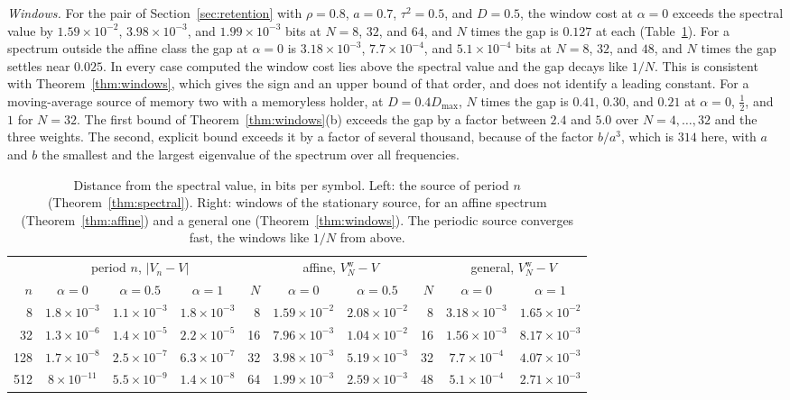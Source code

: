 \documentclass[11pt,onecolumn]{IEEEtran}
\begin{document}
\emph{Windows.} For the pair of Section~\ref{sec:retention} with
$\rho=0.8$, $a=0.7$, $\tau^2=0.5$, and $D=0.5$, the window cost at
$\alpha=0$ exceeds the spectral value by $1.59\times10^{-2}$, $3.98\times10^{-3}$, and $1.99\times10^{-3}$ bits at $N=8$,
$32$, and $64$, and $N$ times the gap is $0.127$ at each
(Table~\ref{tab:conv}). For a spectrum outside the affine class the gap
at $\alpha=0$ is $3.18\times10^{-3}$, $7.7\times10^{-4}$, and $5.1\times10^{-4}$ bits at $N=8$, $32$, and $48$, and
$N$ times the gap settles near $0.025$. In every case computed the window
cost lies above the spectral value and the gap decays like $1/N$. This
is consistent with Theorem~\ref{thm:windows}, which gives the sign and
an upper bound of that order, and does not identify a leading
constant. For a moving-average source of
memory two with a memoryless holder, at $D=0.4D_{\max}$, $N$ times the
gap is $0.41$, $0.30$, and $0.21$ at $\alpha=0$, $\tfrac12$, and $1$ for
$N=32$. The first bound of Theorem~\ref{thm:windows}(b) exceeds the gap
by a factor between $2.4$ and $5.0$ over $N=4,\dots,32$ and the three
weights. The second, explicit bound exceeds it by a factor of several
thousand, because of the factor $b/a^3$, which is $314$ here, with $a$
and $b$ the smallest and the largest eigenvalue of the spectrum over
all frequencies.

\begin{table}[!htb]
\centering
\caption{Distance from the spectral value, in bits per symbol. Left:
the source of period $n$ (Theorem~\ref{thm:spectral}). Right: windows of
the stationary source, for an affine spectrum
(Theorem~\ref{thm:affine}) and a general one
(Theorem~\ref{thm:windows}). The periodic source converges fast, the
windows like $1/N$ from above.}
\label{tab:conv}
\begin{tabular}{rccc@{\qquad}rcc@{\qquad}rcc}
\hline
 & \multicolumn{3}{c}{period $n$, $|V_n-V|$} & & \multicolumn{2}{c}{affine, $V^{\mathrm w}_N-V$} & & \multicolumn{2}{c}{general, $V^{\mathrm w}_N-V$}\\
$n$ & $\alpha=0$ & $\alpha=0.5$ & $\alpha=1$ & $N$ & $\alpha=0$ & $\alpha=0.5$ & $N$ & $\alpha=0$ & $\alpha=1$\\
\hline
8 & $1.8\times10^{-3}$ & $1.1\times10^{-3}$ & $1.8\times10^{-3}$ & 8 & $1.59\times10^{-2}$ & $2.08\times10^{-2}$ & 8 & $3.18\times10^{-3}$ & $1.65\times10^{-2}$\\
32 & $1.3\times10^{-6}$ & $1.4\times10^{-5}$ & $2.2\times10^{-5}$ & 16 & $7.96\times10^{-3}$ & $1.04\times10^{-2}$ & 16 & $1.56\times10^{-3}$ & $8.17\times10^{-3}$\\
128 & $1.7\times10^{-8}$ & $2.5\times10^{-7}$ & $6.3\times10^{-7}$ & 32 & $3.98\times10^{-3}$ & $5.19\times10^{-3}$ & 32 & $7.7\times10^{-4}$ & $4.07\times10^{-3}$\\
512 & $8\times10^{-11}$ & $5.5\times10^{-9}$ & $1.4\times10^{-8}$ & 64 & $1.99\times10^{-3}$ & $2.59\times10^{-3}$ & 48 & $5.1\times10^{-4}$ & $2.71\times10^{-3}$\\
\hline
\end{tabular}
\end{table}
\end{document}
